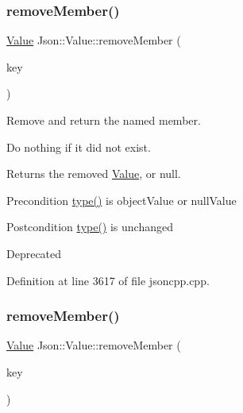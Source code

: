 \hypertarget{class_json_1_1_value_aa52f7873b95d29627d6e83ba96f69aaa}{}\label{class_json_1_1_value_aa52f7873b95d29627d6e83ba96f69aaa} 
\subsubsection{\texorpdfstring{remove\+Member()}{removeMember()}\hspace{0.1cm}{\footnotesize\ttfamily [6/10]}}
{\footnotesize\ttfamily \hyperlink{class_json_1_1_value}{Value} Json\+::\+Value\+::remove\+Member (\begin{DoxyParamCaption}\item[{const char $\ast$}]{key }\end{DoxyParamCaption})}



Remove and return the named member. 

Do nothing if it did not exist. \begin{DoxyReturn}{Returns}
the removed \hyperlink{class_json_1_1_value}{Value}, or null. 
\end{DoxyReturn}
\begin{DoxyPrecond}{Precondition}
\hyperlink{class_json_1_1_value_a8ce61157a011894f0252ceed232312de}{type()} is object\+Value or null\+Value 
\end{DoxyPrecond}
\begin{DoxyPostcond}{Postcondition}
\hyperlink{class_json_1_1_value_a8ce61157a011894f0252ceed232312de}{type()} is unchanged 
\end{DoxyPostcond}
\begin{DoxyRefDesc}{Deprecated}
\item[\hyperlink{deprecated__deprecated000001}{Deprecated}]\end{DoxyRefDesc}


Definition at line 3617 of file jsoncpp.\+cpp.

\hypertarget{class_json_1_1_value_a1dfd5d30fbc53fcd9c4955b8b3e7885c}{}\label{class_json_1_1_value_a1dfd5d30fbc53fcd9c4955b8b3e7885c} 
\subsubsection{\texorpdfstring{remove\+Member()}{removeMember()}\hspace{0.1cm}{\footnotesize\ttfamily [7/10]}}
{\footnotesize\ttfamily \hyperlink{class_json_1_1_value}{Value} Json\+::\+Value\+::remove\+Member (\begin{DoxyParamCaption}\item[{const \hyperlink{config_8h_a1e723f95759de062585bc4a8fd3fa4be}{J\+S\+O\+N\+C\+P\+P\+\_\+\+S\+T\+R\+I\+NG} \&}]{key }\end{DoxyParamCaption})}

